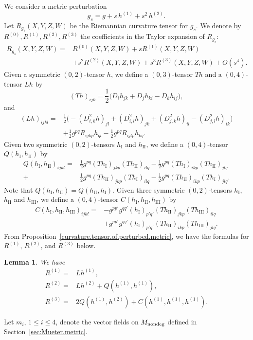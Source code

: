 \documentclass[11pt]{amsart}
\newtheorem{lemma}[theorem]{Lemma}
\theoremstyle{definition}
\begin{document}
We consider a metric perturbation
\[g_s = g + s \, h^{(1)} + s^2 \, h^{(2)}.\] 
Let $R_{g_s}(X,Y,Z,W)$ be the Riemannian curvature tensor for $g_s$.
We denote by $R^{(0)},R^{(1)},R^{(2)},R^{(3)}$ the coefficients in the Taylor expansion of $R_{g_s}$:
\begin{align*}
R_{g_s}(X,Y,Z,W)=&R^{(0)}(X,Y,Z,W)+sR^{(1)}(X,Y,Z,W)\\
&+s^2R^{(2)}(X,Y,Z,W)+s^3R^{(3)}(X,Y,Z,W)+O(s^4). 
\end{align*}
Given a symmetric $(0,2)$-tensor $h$, we define a $(0,3)$-tensor $Th$ and a $(0,4)$-tensor $Lh$ by
\[(Th)_{ijk}=\frac{1}{2}\big( D_i h_{jk}+D_j h_{ki}-D_k h_{ij} \big),\]
and
\begin{align*} 
(Lh)_{ijkl}=&\frac{1}{2}\big(- (D^2_{i,k}h)_{jl}+(D^2_{i,l} h)_{jk}+(D^2_{j,k}h)_{il}-(D^2_{j,l}h)_{ik} \big)\\
&+\frac{1}{2}g^{pq}R_{ijkp}h_{ql}-\frac{1}{2}g^{pq}R_{ijlp}h_{kq}. 
\end{align*}
Given two symmetric $(0,2)$-tensors $h_{\mathrm{I}}$ and $h_{\mathrm{II}}$, we define a $(0,4)$-tensor $Q(h_{\mathrm{I}},h_{\mathrm{II}})$ by
\begin{align*}
Q(h_{\mathrm{I}},h_{\mathrm{II}})_{ijkl}=&\frac{1}{2}g^{pq}(Th_{\mathrm{I}})_{jkp}(Th_{\mathrm{II}})_{ilq}-\frac{1}{2}g^{pq}(Th_{\mathrm{I}})_{ikp}(Th_{\mathrm{II}})_{jlq}\\
+&\frac{1}{2}g^{pq}(Th_{\mathrm{II}})_{jkp}(Th_{\mathrm{I}})_{ilq}-\frac{1}{2}g^{pq}(Th_{\mathrm{II}})_{ikp}(Th_{\mathrm{I}})_{jlq}. 
\end{align*}
Note that $Q(h_{\mathrm{I}},h_{\mathrm{II}}) = Q(h_{\mathrm{II}},h_{\mathrm{I}})$. Given three symmetric $(0,2)$-tensors $h_{\mathrm{I}}$, $h_{\mathrm{II}}$ and $h_{\mathrm{III}}$, we define a $(0,4)$-tensor $C(h_{\mathrm{I}},h_{\mathrm{II}},h_{\mathrm{III}})$ by
\begin{align*}
C(h_{\mathrm{I}},h_{\mathrm{II}},h_{\mathrm{III}})_{ijkl}=&
-g^{pp'}g^{qq'}(h_{\mathrm{I}})_{p'q'}(Th_{\mathrm{II}})_{jkp}(Th_{\mathrm{III}})_{ilq}\\
&+g^{pp'}g^{qq'}(h_{\mathrm{I}})_{p'q'}(Th_{\mathrm{II}})_{ikp}(Th_{\mathrm{III}})_{jlq}.
\end{align*}
From Proposition~\ref{curvature.tensor.of.perturbed.metric}, we have the formulas for $R^{(1)}$, $R^{(2)}$, and $R^{(3)}$ below. 
\begin{lemma}
\label{curvature.tensor.expansion}
We have 
\begin{align*}
R^{(1)}=&Lh^{(1)},\\
R^{(2)}=&Lh^{(2)}+Q(h^{(1)},h^{(1)}),\\
R^{(3)}=&2Q(h^{(1)},h^{(2)})+C(h^{(1)},h^{(1)},h^{(1)}).
\end{align*}
\end{lemma}
Let $m_i$, $1 \leq i\leq 4$, denote the vector fields on $M_{\text{\rm nondeg}}$ defined in Section~\ref{sec:Mueter.metric}.
\end{document}
